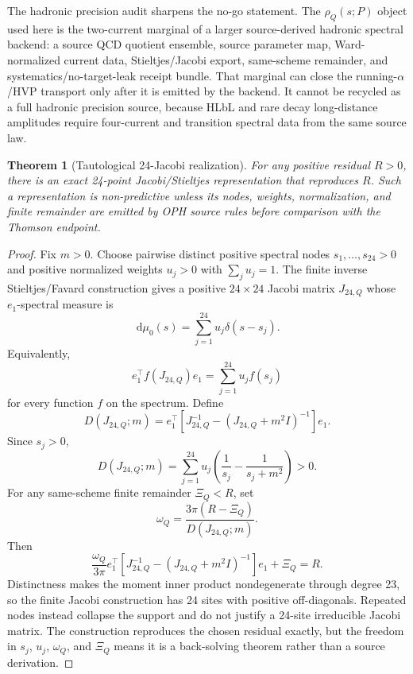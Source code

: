\documentclass[11pt]{article}
\newtheorem{theorem}{Theorem}
\theoremstyle{remark}
\newcommand{\dd}{\,\mathrm d}
\begin{document}
The hadronic precision audit sharpens the no-go statement. The
\(\rho_Q(s;P)\) object used here is the two-current marginal of a larger source-derived hadronic spectral
backend: a source QCD quotient ensemble, source parameter map, Ward-normalized current
data, Stieltjes/Jacobi export, same-scheme remainder, and systematics/no-target-leak receipt
bundle. That marginal can close the running-\(\alpha\)/HVP transport only after it is emitted by
the backend. It cannot be recycled as a full hadronic precision source, because HLbL and rare
decay long-distance amplitudes require four-current and transition spectral data from the same
source law.

\begin{theorem}[Tautological 24-Jacobi realization]
For any positive residual \(R>0\), there is an exact 24-point Jacobi/Stieltjes representation that
reproduces \(R\). Such a representation is non-predictive unless its nodes, weights,
normalization, and finite remainder are emitted by OPH source rules before comparison with the
Thomson endpoint.
\end{theorem}

\begin{proof}
Fix \(m>0\). Choose pairwise distinct positive spectral nodes
\(s_1,\ldots,s_{24}>0\) and positive normalized weights
\(u_j>0\) with \(\sum_j u_j=1\). The finite inverse Stieltjes/Favard construction gives a
positive \(24\times24\) Jacobi matrix \(J_{24,Q}\) whose \(e_1\)-spectral measure is
\[
\dd\mu_0(s)=\sum_{j=1}^{24}u_j\delta(s-s_j).
\]
Equivalently,
\[
e_1^\top f(J_{24,Q})e_1=\sum_{j=1}^{24}u_j f(s_j)
\]
for every function \(f\) on the spectrum. Define
\[
D(J_{24,Q};m)
=
e_1^\top\!\left[J_{24,Q}^{-1}-(J_{24,Q}+m^2I)^{-1}\right]e_1.
\]
Since \(s_j>0\),
\[
D(J_{24,Q};m)=
\sum_{j=1}^{24}u_j\left(\frac1{s_j}-\frac1{s_j+m^2}\right)>0.
\]
For any same-scheme finite remainder \(\Xi_Q<R\), set
\[
\omega_Q=\frac{3\pi(R-\Xi_Q)}{D(J_{24,Q};m)}.
\]
Then
\[
\frac{\omega_Q}{3\pi}
e_1^\top\!\left[J_{24,Q}^{-1}-(J_{24,Q}+m^2I)^{-1}\right]e_1
+\Xi_Q
=R.
\]
Distinctness makes the moment inner product nondegenerate through degree 23,
so the finite Jacobi construction has 24 sites with positive off-diagonals.
Repeated nodes instead collapse the support and do not justify a 24-site
irreducible Jacobi matrix. The construction reproduces the chosen residual exactly, but the freedom in \(s_j\), \(u_j\),
\(\omega_Q\), and \(\Xi_Q\) means it is a back-solving theorem rather than a source derivation.
\end{proof}
\end{document}
